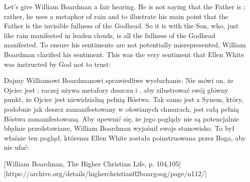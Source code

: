 Let's give William Boardman a fair hearing. He is not saying that the Father is ; rather, he uses a metaphor of rain and  to illustrate his main point that the Father is the invisible fullness of the Godhead. So it is with the Son, who, just like rain manifested in leaden clouds, is all the fullness of the Godhead manifested. To ensure his sentiments are not potentially misrepresented, William Boardman clarified his sentiment. This was the very sentiment that Ellen White was instructed by God not to trust:


Dajmy Williamowi Boardmanowi sprawiedliwe wysłuchanie. Nie mówi on, że Ojciec jest ; raczej używa metafory deszczu i , aby zilustrować swój główny punkt, że Ojciec jest niewidzialną pełnią Bóstwa. Tak samo jest z Synem, który, podobnie jak deszcz zamanifestowany w ołowianych chmurach, jest całą pełnią Bóstwa zamanifestowaną. Aby upewnić się, że jego poglądy nie są potencjalnie błędnie przedstawiane, William Boardman wyjaśnił swoje stanowisko. To był właśnie ten pogląd, któremu Ellen White została poinstruowana przez Boga, aby nie ufać:


[William Boardman, The Higher Christian Life, p. 104,105][https://archive.org/details/higherchristian02boargoog/page/n112/]


